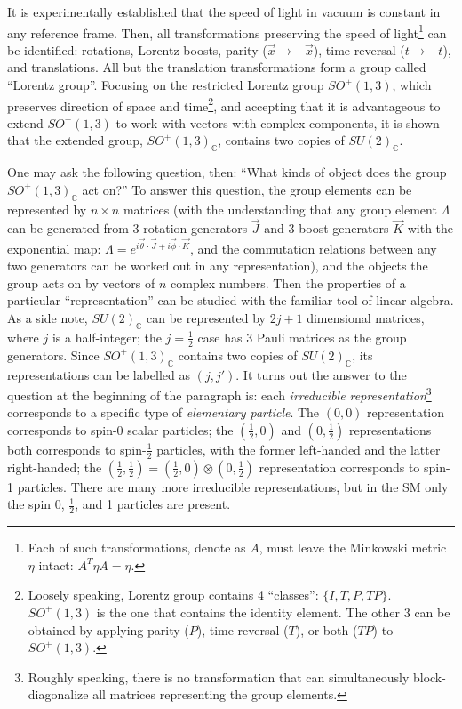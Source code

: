 It is experimentally established that the speed of light in vacuum is constant
in any reference frame.
Then, all transformations preserving the speed of light\footnote{
    Each of such transformations, denote as $A$, must leave the Minkowski metric
    $\eta$ intact: $A^T \eta A = \eta$.
} can be identified:
rotations, Lorentz boosts, parity ($\vec{x} \rightarrow -\vec{x}$),
time reversal ($t \rightarrow -t$), and translations.
All but the translation transformations form a group called
``Lorentz group''.
Focusing on the restricted Lorentz group $SO^+(1, 3)$,
which preserves direction of space and time\footnote{
    Loosely speaking, Lorentz group contains 4 ``classes'': $\{I, T, P, TP\}$.
    $SO^+(1,3)$ is the one that contains the identity element.
    The other 3 can be obtained by applying parity ($P$), time reversal ($T$),
    or both ($TP$) to $SO^+(1,3)$.
},
and accepting that it is advantageous to extend $SO^+(1,3)$ to work with vectors
with complex components,
it is shown that the extended group, $SO^+(1,3)_\mathbb{C}$,
contains two copies of $SU(2)_\mathbb{C}$.

One may ask the following question, then:
``What kinds of object does the group $SO^+(1,3)_\mathbb{C}$ act on?''
To answer this question, the group elements can be represented by $n \times n$
matrices
(with the understanding that any group element $\Lambda$ can be generated from 3
rotation generators $\vec{J}$ and 3 boost generators $\vec{K}$
with the exponential map:
$\Lambda = e^{i \vec{\theta} \cdot \vec{J} + i \vec{\phi} \cdot \vec{K}}$,
and the commutation relations between any two generators can be worked out in
any representation),
and the objects the group acts on by vectors of $n$ complex numbers.
Then the properties of a particular ``representation'' can be studied with
the familiar tool of linear algebra.
As a side note,
$SU(2)_\mathbb{C}$ can be represented by $2j + 1$ dimensional matrices,
where $j$ is a half-integer;
the $j = \frac{1}{2}$ case has 3 Pauli matrices as the group generators.
Since $SO^+(1,3)_\mathbb{C}$ contains two copies of $SU(2)_\mathbb{C}$,
its representations can be labelled as $(j, j')$.
It turns out the answer to the question at the beginning of the paragraph is:
each \emph{irreducible representation}\footnote{
    Roughly speaking, there is no transformation that can simultaneously
    block-diagonalize all matrices representing the group elements.
}
corresponds to a specific type of \emph{elementary particle}.
The $(0, 0)$ representation corresponds to spin-0 scalar particles;
the $(\frac{1}{2}, 0)$ and $(0, \frac{1}{2})$ representations both corresponds to
spin-$\frac{1}{2}$ particles,
with the former left-handed and the latter right-handed;
the $(\frac{1}{2}, \frac{1}{2}) = (\frac{1}{2}, 0) \otimes (0, \frac{1}{2})$
representation corresponds to spin-1 particles.
There are many more irreducible representations,
but in the SM only the spin 0, $\frac{1}{2}$, and 1 particles are present.

